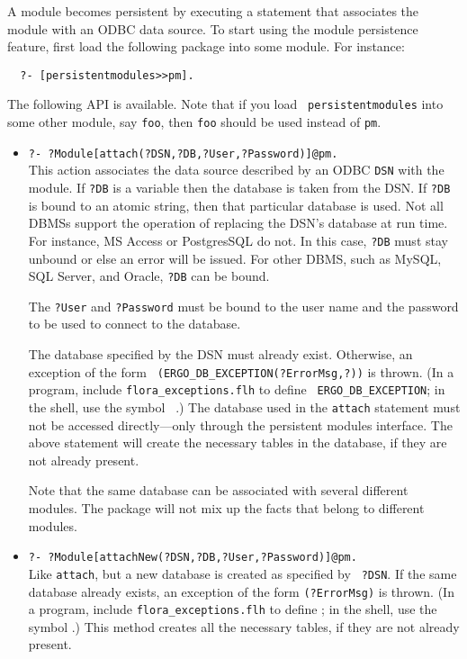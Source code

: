 A module becomes persistent by executing a statement that associates the
module with an ODBC data source. To start using the module persistence
feature, first load the following package into some module. For instance:
\begin{verbatim}
  ?- [persistentmodules>>pm].
\end{verbatim}
The following API is available. Note that if you load {\tt
  persistentmodules} into some other module, say {\tt foo}, then {\tt foo}
should be used instead of {\tt pm}.    
\begin{itemize}
\item {\tt ?- ?Module[attach(?DSN,?DB,?User,?Password)]@pm.}\\
  This action associates the data source described by an ODBC {\tt DSN}
  with the module.  If {\tt ?DB} is a variable then the database is taken
  from the DSN. If {\tt ?DB} is bound to an atomic string, then that particular
  database is used. Not all DBMSs support the operation of replacing the
  DSN's database at run time. For instance, MS Access or PostgresSQL do not.
  In this case, {\tt ?DB} must stay unbound or else an error will be issued.
  For other DBMS, such as MySQL, SQL Server, and Oracle, {\tt ?DB} can be
  bound. 

  The {\tt ?User} and {\tt ?Password} must be bound to the user name and
  the password to be used to connect to the database.

  The database specified by the DSN must already exist. Otherwise, an
  exception of the form {\tt
    \FLABORT(ERGO\_DB\_EXCEPTION(?ErrorMsg,?))} is thrown.  (In a
  program, include {\tt flora\_exceptions.flh} to define {\tt
    ERGO\_DB\_EXCEPTION}; in the shell, use the symbol {\tt
    \fldbexception}.)  The database used in the {\tt attach}
  statement must not be accessed directly---only through the persistent
  modules interface.  The above statement will create the necessary tables
  in the database, if they are not already present.

  Note that the same database can be associated with several different
  modules. The package will not mix up the facts that belong to different
  modules.
\item {\tt ?- ?Module[attachNew(?DSN,?DB,?User,?Password)]@pm.}\\
  Like {\tt attach}, but a new database is created as specified by {\tt
    ?DSN}.  If the same database already exists, an exception of the form
  {\tt \FLDBEXCEPTION(?ErrorMsg)} is thrown.  (In a program, include
  {\tt flora\_exceptions.flh} to define {\tt \FLDBEXCEPTION}; in the
  shell, use the symbol {\tt \fldbexception}.)  This method creates
  all the necessary tables, if they are not already present.
  

\end{itemize}
